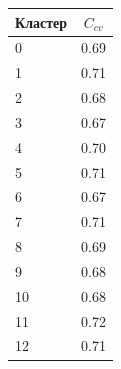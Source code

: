 \documentclass[14pt,a4paper]{article}
\begin{document}
\begin{table}[H]
\centering
\begin{tabular}{|l|l|}
\hline
\multicolumn{1}{|c|}{\textbf{Кластер}} & \multicolumn{1}{c|}{\textbf{$C_{cv}$}} \\ \hline
0                                                                                       & 0.69                                    \\ \hline
1                                                                                       & 0.71                                    \\ \hline
2                                                                                       & 0.68                                    \\ \hline
3                                                                                      & 0.67                                    \\ \hline
4                                                                                       & 0.70                                    \\ \hline
5                                                                                       & 0.71                                    \\ \hline
6                                                                                      & 0.67                                    \\ \hline
7                                                                                      & 0.71                                    \\ \hline
8                                                                                       & 0.69                                    \\ \hline
9                                                                                       & 0.68                                    \\ \hline
10                                                                                      & 0.68                                    \\ \hline
11                                                                                      & 0.72                                    \\ \hline
12                                                                                      & 0.71                                    \\ \hline

\end{tabular}
\end{table}
\end{document}

